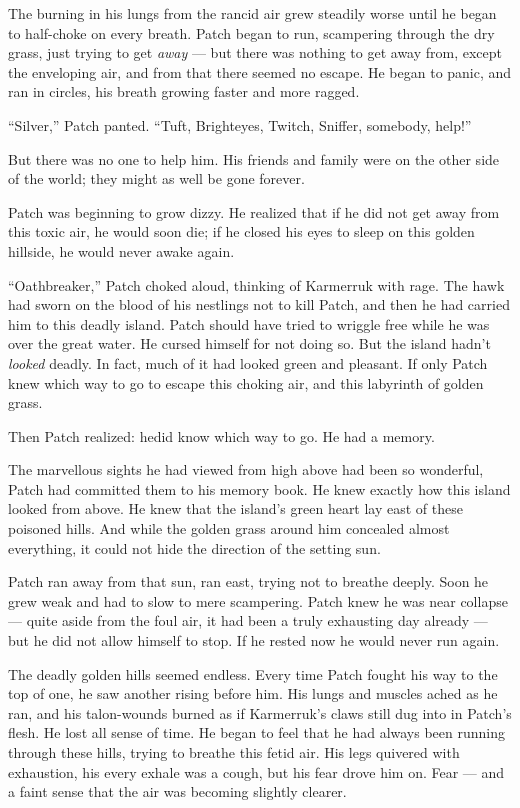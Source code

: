 \documentclass[ebook,oneside,openany,17pt]{memoir}
\begin{document}
The burning in his lungs from the rancid air grew steadily worse until
he began to half-choke on every breath. Patch began to run, scampering
through the dry grass, just trying to get \emph{away} — but there
was nothing to get away from, except the enveloping air, and from that
there seemed no escape. He began to panic, and ran in circles, his
breath growing faster and more ragged.

“Silver,” Patch panted. “Tuft, Brighteyes, Twitch, Sniffer, somebody,
help!”

But there was no one to help him. His friends and family were on the
other side of the world; they might as well be gone forever.

Patch was beginning to grow dizzy. He realized that if he did not get
away from this toxic air, he would soon die; if he closed his eyes to
sleep on this golden hillside, he would never awake again.

“Oathbreaker,” Patch choked aloud, thinking of Karmerruk with
rage. The hawk had sworn on the blood of his nestlings not to kill
Patch, and then he had carried him to this deadly island. Patch should
have tried to wriggle free while he was over the great water. He
cursed himself for not doing so. But the island hadn’t \emph{looked}
deadly. In fact, much of it had looked green and pleasant. If only
Patch knew which way to go to escape this choking air, and this
labyrinth of golden grass.

Then Patch realized: he\emph{}did know which way to go. He had a
memory.

The marvellous sights he had viewed from high above had been so
wonderful, Patch had committed them to his memory book. He knew
exactly how this island looked from above. He knew that the island’s
green heart lay east of these poisoned hills. And while the golden
grass around him concealed almost everything, it could not hide the
direction of the setting sun.

Patch ran away from that sun, ran east, trying not to breathe
deeply. Soon he grew weak and had to slow to mere scampering. Patch
knew he was near collapse — quite aside from the foul air, it had been
a truly exhausting day already — but he did not allow himself to
stop. If he rested now he would never run again.

The deadly golden hills seemed endless. Every time Patch fought his
way to the top of one, he saw another rising before him. His lungs and
muscles ached as he ran, and his talon-wounds burned as if Karmerruk’s
claws still dug into in Patch’s flesh. He lost all sense of time. He
began to feel that he had always been running through these hills,
trying to breathe this fetid air. His legs quivered with exhaustion,
his every exhale was a cough, but his fear drove him on. Fear — and a
faint sense that the air was becoming slightly clearer.
\end{document}
